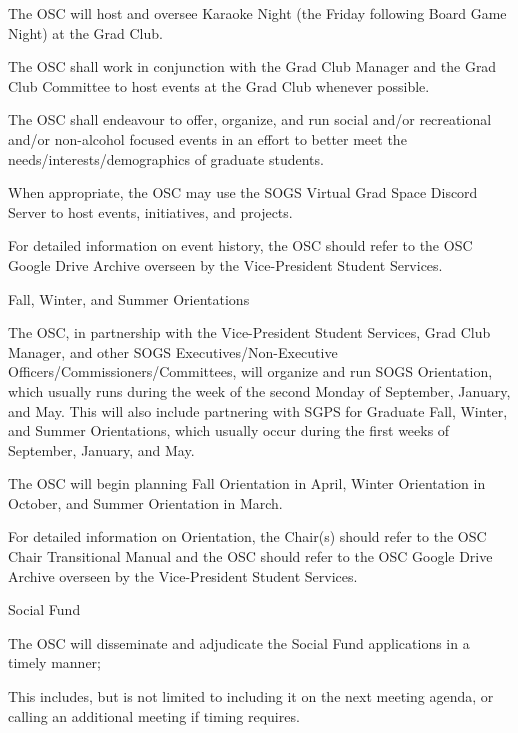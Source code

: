 \begin{longenum}[ label*=\thesubsection.\arabic*., align=left]
		\item The OSC will host and oversee Karaoke Night (the Friday following Board Game Night) at the Grad Club.
		\item The OSC shall work in conjunction with the Grad Club Manager and the Grad Club Committee to host events at the Grad Club whenever possible.		
		\item The OSC shall endeavour to offer, organize, and run social and/or recreational and/or non-alcohol focused events in an effort to better meet the needs/interests/demographics of graduate students.		
		\item When appropriate, the OSC may use the SOGS Virtual Grad Space Discord Server to host events, initiatives, and projects.		
		\item For detailed information on event history, the OSC should refer to the OSC Google Drive Archive overseen by the Vice-President Student Services.		
	\item Fall, Winter, and Summer Orientations
		\begin{longenum}[label*=\arabic*., align=left]
		\item The OSC, in partnership with the Vice-President Student Services, Grad Club Manager, and other SOGS Executives/Non-Executive Officers/Commissioners/Committees, will organize and run SOGS Orientation, which usually runs during the week of the second Monday of September, January, and May. This will also include partnering with SGPS for Graduate Fall, Winter, and Summer Orientations, which usually occur during the first weeks of September, January, and May.
		\item The OSC will begin planning Fall Orientation in April, Winter Orientation in October, and Summer Orientation in March.
		\item For detailed information on Orientation, the Chair(s) should refer to the OSC Chair Transitional Manual and the OSC should refer to the OSC Google Drive Archive overseen by the Vice-President Student Services.				
		\end{longenum}
	\item Social Fund
		\begin{longenum}[label*=\arabic*., align=left]
		\item The OSC will disseminate and adjudicate the Social Fund applications in a timely manner;
			\begin{longenum}[label*=\arabic*., align=left]
			\item This includes, but is not limited to including it on the next meeting agenda, or calling an additional meeting if timing requires.

\end{longenum}
\end{longenum}
\end{longenum}
